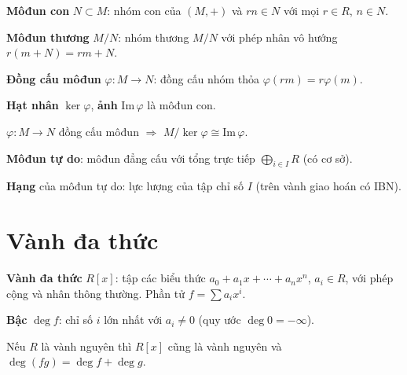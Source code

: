 \documentclass[12pt,a4paper]{article}
\begin{document}
\begin{dinhnghia}
  \textbf{Môđun con} $N \subset M$: nhóm con của $(M,+)$ và $rn \in N$ với mọi $r \in R$, $n \in N$.
\end{dinhnghia}

\begin{dinhnghia}
  \textbf{Môđun thương} $M/N$: nhóm thương $M/N$ với phép nhân vô hướng $r(m + N) = rm + N$.
\end{dinhnghia}

\begin{dinhnghia}
  \textbf{Đồng cấu môđun} $\varphi: M \to N$: đồng cấu nhóm thỏa $\varphi(rm) = r\varphi(m)$.
  
  \textbf{Hạt nhân} $\ker \varphi$, \textbf{ảnh} $\mathrm{Im}\,\varphi$ là môđun con.
\end{dinhnghia}

\begin{dinhly}[title={Định lý đồng cấu môđun}]
  $\varphi: M \to N$ đồng cấu môđun $\Rightarrow$ $M/\ker \varphi \cong \mathrm{Im}\,\varphi$.
\end{dinhly}

\begin{dinhnghia}
  \textbf{Môđun tự do}: môđun đẳng cấu với tổng trực tiếp $\bigoplus_{i \in I} R$ (có cơ sở).
  
  \textbf{Hạng} của môđun tự do: lực lượng của tập chỉ số $I$ (trên vành giao hoán có IBN).
\end{dinhnghia}

\section{Vành đa thức}

\begin{dinhnghia}
  \textbf{Vành đa thức} $R[x]$: tập các biểu thức $a_0 + a_1 x + \cdots + a_n x^n$, $a_i \in R$, với phép cộng và nhân thông thường. Phần tử $f = \sum a_i x^i$.
  
  \textbf{Bậc} $\deg f$: chỉ số $i$ lớn nhất với $a_i \ne 0$ (quy ước $\deg 0 = -\infty$).
\end{dinhnghia}

\begin{dinhly}
  Nếu $R$ là vành nguyên thì $R[x]$ cũng là vành nguyên và $\deg(fg) = \deg f + \deg g$.
\end{dinhly}
\end{document}
